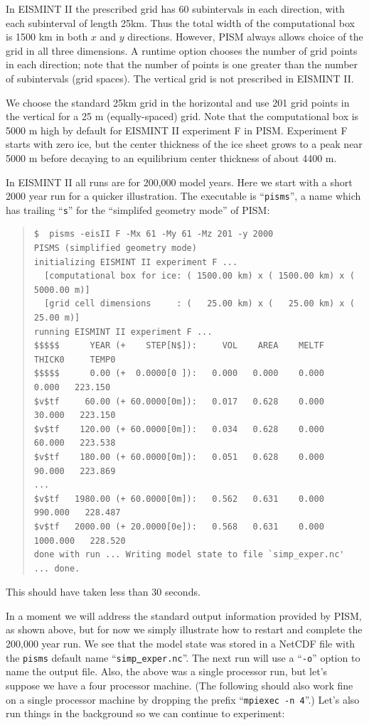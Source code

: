 \documentclass[11pt,final]{amsart}
\renewcommand{\t}[1]{\texttt{#1}}
\begin{document}
In EISMINT II the prescribed grid has 60 subintervals in each direction, with each subinterval of length 25km.  Thus the total width of the computational box is 1500 km in both $x$ and $y$ directions.  However, PISM always allows choice of the grid in all three dimensions.  A runtime option chooses the number of grid points in each direction; note that the number of points is one greater than the number of subintervals (grid spaces).  The vertical grid is not prescribed in EISMINT II.

We choose the standard 25km grid in the horizontal and use 201 grid points in the vertical for a 25 m (equally-spaced) grid.  Note that the computational box is 5000 m high by default for EISMINT II experiment F in PISM.  Experiment F starts with zero ice, but the center thickness of the ice sheet grows to a peak near 5000 m before decaying to an equilibrium center thickness of about 4400 m.

In EISMINT II all runs are for 200,000 model years.  Here we start with a short 2000 year run for a quicker illustration.  The executable is ``\t{pisms}'', a name which has trailing ``\t{s}'' for the ``simplifed geometry mode'' of PISM:

\small\begin{quote}\begin{verbatim}
$  pisms -eisII F -Mx 61 -My 61 -Mz 201 -y 2000
PISMS (simplified geometry mode)
initializing EISMINT II experiment F ...
  [computational box for ice: ( 1500.00 km) x ( 1500.00 km) x ( 5000.00 m)]
  [grid cell dimensions     : (   25.00 km) x (   25.00 km) x (   25.00 m)]
running EISMINT II experiment F ...
$$$$$      YEAR (+    STEP[N$]):     VOL    AREA    MELTF     THICK0     TEMP0
$$$$$      0.00 (+  0.0000[0 ]):   0.000   0.000    0.000      0.000   223.150
$v$tf     60.00 (+ 60.0000[0m]):   0.017   0.628    0.000     30.000   223.150
$v$tf    120.00 (+ 60.0000[0m]):   0.034   0.628    0.000     60.000   223.538
$v$tf    180.00 (+ 60.0000[0m]):   0.051   0.628    0.000     90.000   223.869
...
$v$tf   1980.00 (+ 60.0000[0m]):   0.562   0.631    0.000    990.000   228.487
$v$tf   2000.00 (+ 20.0000[0e]):   0.568   0.631    0.000   1000.000   228.520
done with run ... Writing model state to file `simp_exper.nc' ... done.
\end{verbatim}
\end{quote}\normalsize
\noindent This should have taken less than 30 seconds.

In a moment we will address the standard output information provided by PISM, as shown above, but for now we simply illustrate how to restart and complete the 200,000 year run.  We see that the model state was stored in a NetCDF file with the \verb|pisms| default name ``\texttt{simp\underline{ }exper.nc}''.  The next run will use a ``\verb|-o|'' option to name the output file.  Also, the above was a single processor run, but let's suppose we have a four processor machine.  (The following should also work fine on a single processor machine  by dropping the prefix ``\verb|mpiexec -n 4|''.)  Let's also run things in the background so we can continue to experiment:
\end{document}
